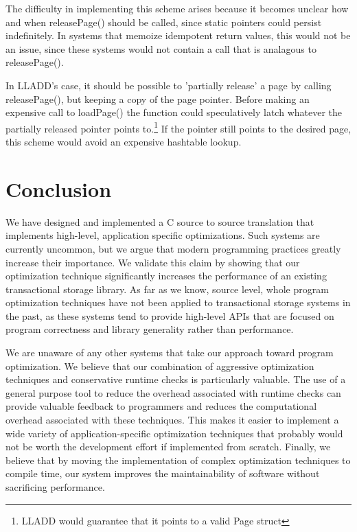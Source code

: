 \documentclass[10pt,letterpaper,twocolumn,english]{article}
\newcommand{\yad}{LLADD\xspace}
\newcommand{\pin}{loadPage()\xspace}
\newcommand{\unpin}{releasePage()\xspace}
\begin{document}
The difficulty in implementing this scheme arises because it becomes
unclear how and when \unpin should be called, since static pointers
could persist indefinitely.  In systems that
memoize idempotent return values, this would not be an issue, since
these systems would not contain a call that is analagous to \unpin.

In \yad's case, it should be possible to 'partially release' a page by
calling \unpin, but keeping a copy of the page pointer.  Before making
an expensive call to \pin the function could speculatively latch
whatever the partially released pointer points
to.\footnote{\yad would guarantee that it points to a valid Page
struct} If the pointer still points to the desired page, this
scheme would avoid an expensive hashtable lookup.

\section{Conclusion}

We have designed and implemented a C source to source translation that
implements high-level, application specific optimizations.  Such
systems are currently uncommon, but we argue that modern programming
practices greatly increase their importance.  We validate this claim
by showing that our optimization technique significantly increases the
performance of an existing transactional storage library.  As far as
we know, source level, whole program optimization techniques have not
been applied to transactional storage systems in the past, as these
systems tend to provide high-level APIs that are focused on program 
correctness and library generality rather than performance.
 
We are unaware of any other
systems that take our approach toward program optimization.  We
believe that our combination of aggressive optimization techniques
and conservative runtime checks is particularly valuable.  The use of
a general purpose tool to reduce the overhead associated with runtime
checks can provide valuable feedback to programmers and reduces the 
computational overhead associated with these techniques.  This
makes it easier to implement a wide variety of application-specific
optimization techniques that probably would not be worth the
development effort if implemented from scratch.  Finally, we believe
that by moving the implementation of complex optimization techniques
to compile time, our system improves the maintainability of software
without sacrificing performance.
\end{document}
